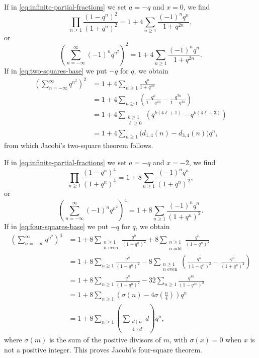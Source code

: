 \documentclass[10pt]{article}
\begin{document}
If in \eqref{eq:infinite-partial-fractions} we set $a=-q$ and $x=0$, we find
\[
\prod_{n\geq 1}\frac{(1-q^n)^2}{(1+q^n)^2}
 =1+4\sum_{n\geq 1}\frac{(-1)^nq^n}{1+q^{2n}},
\]
or
\begin{equation}
\left(\sum_{n=-\infty}^{\infty}(-1)^nq^{n^2}\right)^2
 =1+4\sum_{n\geq 1}\frac{(-1)^nq^n}{1+q^{2n}}.
\label{eq:two-squares-base}
\end{equation}
If in \eqref{eq:two-squares-base} we put $-q$ for $q$, we obtain
\[
\begin{aligned}
\left(\sum_{n=-\infty}^{\infty}q^{n^2}\right)^2
 &=1+4\sum_{n\geq 1}\frac{q^n}{1+q^{2n}} \\
 &=1+4\sum_{n\geq 1}
   \left(\frac{q^n}{1-q^{4n}}-\frac{q^{3n}}{1-q^{4n}}\right) \\
 &=1+4\sum_{\substack{k\geq 1\\\ell\geq 0}}
   \left(q^{k(4\ell+1)}-q^{k(4\ell+3)}\right) \\
 &=1+4\sum_{n\geq 1}\bigl(d_{1,4}(n)-d_{3,4}(n)\bigr)q^n,
\end{aligned}
\]
from which Jacobi's two-square theorem follows.

If in \eqref{eq:infinite-partial-fractions} we set $a=-q$ and $x=-2$, we find
\[
\prod_{n\geq 1}\frac{(1-q^n)^4}{(1+q^n)^4}
 =1+8\sum_{n\geq 1}\frac{(-1)^nq^n}{(1+q^n)^2},
\]
or
\begin{equation}
\left(\sum_{n=-\infty}^{\infty}(-1)^nq^{n^2}\right)^4
 =1+8\sum_{n\geq 1}\frac{(-1)^nq^n}{(1+q^n)^2}.
\label{eq:four-squares-base}
\end{equation}
If in \eqref{eq:four-squares-base} we put $-q$ for $q$, we obtain
\[
\begin{aligned}
\left(\sum_{n=-\infty}^{\infty}q^{n^2}\right)^4
 &=1+8\sum_{\substack{n\geq 1\\n\text{ even}}}
       \frac{q^n}{(1+q^n)^2}
   +8\sum_{\substack{n\geq 1\\n\text{ odd}}}
       \frac{q^n}{(1-q^n)^2} \\
 &=1+8\sum_{n\geq 1}\frac{q^n}{(1-q^n)^2}
   -8\sum_{\substack{n\geq 1\\n\text{ even}}}
    \left(\frac{q^n}{(1-q^n)^2}-\frac{q^n}{(1+q^n)^2}\right) \\
 &=1+8\sum_{n\geq 1}\frac{q^n}{(1-q^n)^2}
   -32\sum_{n\geq 1}\frac{q^{4n}}{(1-q^{4n})^2} \\
 &=1+8\sum_{n\geq 1}
   \left(\sigma(n)-4\sigma\!\left(\frac{n}{4}\right)\right)q^n \\
 &=1+8\sum_{n\geq 1}
   \left(\sum_{\substack{d\mid n\\4\nmid d}}d\right)q^n,
\end{aligned}
\]
where $\sigma(m)$ is the sum of the positive divisors of $m$, with
$\sigma(x)=0$ when $x$ is not a positive integer. This proves Jacobi's
four-square theorem.
\end{document}
